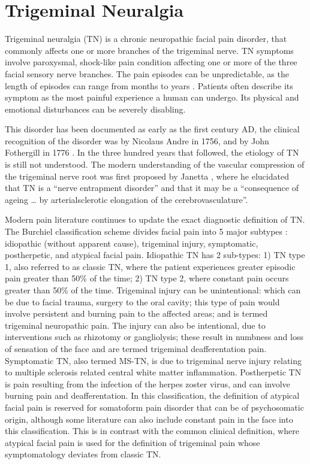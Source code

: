 \section{Trigeminal Neuralgia}

Trigeminal neuralgia (TN) is a chronic neuropathic facial pain disorder, that commonly affects one or more branches of the trigeminal nerve. TN symptoms involve paroxysmal, shock-like pain condition affecting one or more of the three facial sensory nerve branches. The pain episodes can be unpredictable, as the length of episodes can range from months to years \cite{Katusic1990}. Patients often describe its symptom as the most painful experience a human can undergo. Its physical and emotional disturbances can be severely disabling. 

This disorder has been documented as early as the first century AD, the clinical recognition of the disorder was by Nicolaus Andre in 1756, and by John Fothergill in 1776 \cite{Katusic1990}. In the three hundred years that followed, the etiology of TN is still not understood. The modern understanding of the vascular compression of the trigeminal nerve root was first proposed by Janetta \cite{Jannetta1967}, where he elucidated that TN is a “nerve entrapment disorder” and that it may be a “consequence of ageing … by arterialsclerotic elongation of the cerebrovasculature”.

Modern pain literature continues to update the exact diagnostic definition of TN. The Burchiel classification scheme divides facial pain into 5 major subtypes \cite{Burchiel2003,Eller2005}: idiopathic (without apparent cause), trigeminal injury, symptomatic, postherpetic, and atypical facial pain. Idiopathic TN has 2 sub-types: 1) TN type 1, also referred to as classic TN, where the patient experiences greater episodic pain greater than 50\% of the time; 2) TN type 2, where constant pain occurs greater than 50\% of the time. Trigeminal injury can be unintentional: which can be due to facial trauma, surgery to the oral cavity; this type of pain would involve persistent and burning pain to the affected areas; and is termed trigeminal neuropathic pain. The injury can also be intentional, due to interventions such as rhizotomy or gangliolysis; these result in numbness and loss of sensation of the face and are termed trigeminal deafferentation pain. Symptomatic TN, also termed MS-TN, is due to trigeminal nerve injury relating to multiple sclerosis related central white matter inflammation. Postherpetic TN is pain resulting from the infection of the herpes zoster virus, and can involve burning pain and deafferentation. In this classification, the definition of atypical facial pain is reserved for somatoform pain disorder that can be of psychosomatic origin, although some literature can also include constant pain in the face into this classification. This is in contrast with the common clinical definition, where atypical facial pain is used for the definition of trigeminal pain whose symptomatology deviates from classic TN.

